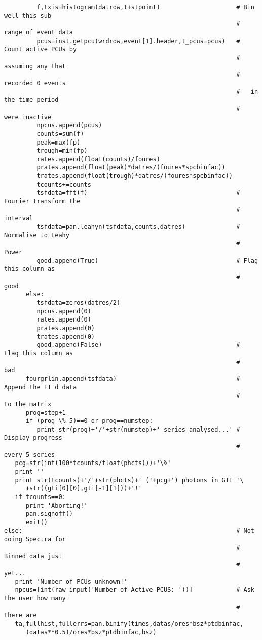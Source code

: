 \begin{verbatim}
         f,txis=histogram(datrow,t+stpoint)                     # Bin well this sub
                                                                #   range of event data
         pcus=inst.getpcu(wrdrow,event[1].header,t_pcus=pcus)   # Count active PCUs by
                                                                #   assuming any that
                                                                #   recorded 0 events
                                                                #   in the time period
                                                                #   were inactive
         npcus.append(pcus)
         counts=sum(f)
         peak=max(fp)
         trough=min(fp)
         rates.append(float(counts)/foures)
         prates.append(float(peak)*datres/(foures*spcbinfac))
         trates.append(float(trough)*datres/(foures*spcbinfac))
         tcounts+=counts
         tsfdata=fft(f)                                         # Fourier transform the
                                                                #   interval
         tsfdata=pan.leahyn(tsfdata,counts,datres)              # Normalise to Leahy
                                                                #   Power
         good.append(True)                                      # Flag this column as
                                                                #   good
      else:
         tsfdata=zeros(datres/2)
         npcus.append(0)
         rates.append(0)
         prates.append(0)
         trates.append(0)
         good.append(False)                                     #  Flag this column as
                                                                #    bad
      fourgrlin.append(tsfdata)                                 #  Append the FT'd data
                                                                #    to the matrix
      prog=step+1
      if (prog \% 5)==0 or prog==numstep:
         print str(prog)+'/'+str(numstep)+' series analysed...' # Display progress 
                                                                #   every 5 series
   pcg=str(int(100*tcounts/float(phcts)))+'\%'
   print ''
   print str(tcounts)+'/'+str(phcts)+' ('+pcg+') photons in GTI '\
      +str((gti[0][0],gti[-1][1]))+'!'
   if tcounts==0:
      print 'Aborting!'
      pan.signoff()
      exit()
else:                                                           # Not doing Spectra for
                                                                #   Binned data just
                                                                #   yet...
   print 'Number of PCUs unknown!'
   npcus=[int(raw_input('Number of Active PCUS: '))]            # Ask the user how many
                                                                #   there are
   ta,fullhist,fullerrs=pan.binify(times,datas/ores*bsz*ptdbinfac,
      (datas**0.5)/ores*bsz*ptdbinfac,bsz)


\end{verbatim}
